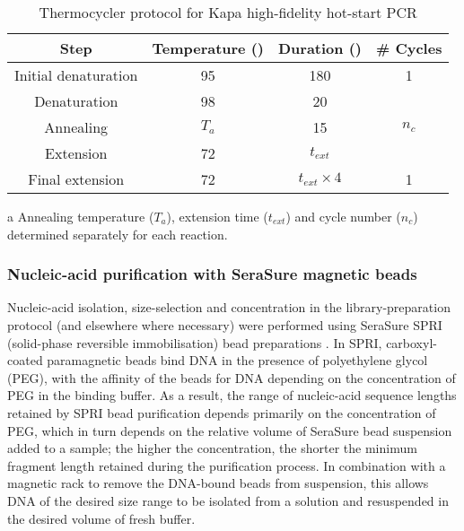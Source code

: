 \begin{table}[h]
\centering
\caption{Thermocycler protocol for Kapa high-fidelity hot-start PCR}
\label{tab:kapa}
\begin{threeparttable}
\begin{tabular}{cccc}\toprule
\textbf{Step} & \textbf{Temperature (\degC{})} & \textbf{Duration (\secs{})} & \textbf{\# Cycles}\\\midrule
Initial denaturation & 95 & 180 & 1 \\\midrule
Denaturation & 98 & 20 & \multirow{3}{*}{$n_c$\tnote{a}}\\
Annealing & $T_a$\tnote{a} \tnote{} & 15 & \\
Extension & 72 & $t_{ext}$\tnote{a} & \\\midrule
Final extension & 72 & $t_{ext} \times 4$\tnote{a} & 1\\
\bottomrule\end{tabular}
\begin{tablenotes}
\item[a] Annealing temperature ($T_a$), extension time ($t_{ext}$) and cycle number ($n_c$) determined separately for each reaction.
\end{tablenotes}
\end{threeparttable}
\end{table}

\subsubsection{Nucleic-acid purification with SeraSure magnetic beads}
\label{sec:methods_molec_standard_serasure}

Nucleic-acid isolation, size-selection and concentration in the \igseq library-preparation protocol (and elsewhere where necessary) were performed using SeraSure SPRI (solid-phase reversible immobilisation) bead preparations \parencite{hawkins1994spri,deangelis1995spri,lennon2010cleanup,fisher2011cleanup}. In SPRI, carboxyl-coated paramagnetic beads bind DNA in the presence of polyethylene glycol (PEG), with the affinity of the beads for DNA depending on the concentration of PEG in the binding buffer. As a result, the range of nucleic-acid sequence lengths retained by SPRI bead purification depends primarily on the concentration of PEG, which in turn depends on the relative volume of SeraSure bead suspension added to a sample; the higher the concentration, the shorter the minimum fragment length retained during the purification process. In combination with a magnetic rack to remove the DNA-bound beads from suspension, this allows DNA of the desired size range to be isolated from a solution and resuspended in the desired volume of fresh buffer.

